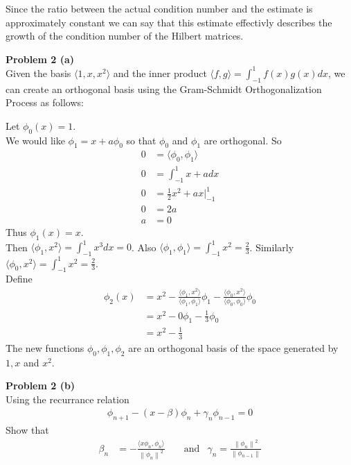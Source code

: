 \documentclass[12pt]{article}
\newcommand{\problem}[1]{\hspace{-4 ex} \large \textbf{Problem #1} }
\newcommand{\norm}[1]{\left\lVert#1\right\rVert}
\begin{document}
	Since the ratio between the actual condition number and the estimate is approximately constant we can say that this estimate effectivly describes the growth of the condition number of the Hilbert matrices. 
	
\problem{2 (a)} \\
	
	Given the basis $ \langle 1, x, x^2 \rangle$ and the inner product $\langle f, g \rangle = \int_{-1}^1 f(x)g(x)dx$, we can create an orthogonal basis using the Gram-Schmidt Orthogonalization Process as follows:\bigbreak
	
	Let $\phi_0(x) = 1$. \\
	We would like $\phi_1 = x + a \phi_0$ so that $\phi_0$ and $\phi_1$ are orthogonal. So
	\begin{align*}
		0 & = \langle \phi_0, \phi_1 \rangle \\
		0 & = \int_{-1}^1 x + a dx \\
		0 & = \tfrac{1}{2}x^2 + ax \big\vert_{-1}^1 \\
		0 & = 2a \\
		a & = 0
	\end{align*}
	Thus $\phi_1(x) = x$. \\
	Then $\langle \phi_1, x^2 \rangle = \int_{-1}^1 x^3 dx = 0$. Also $ \langle \phi_1, \phi_1 \rangle = \int_{-1}^1 x^2 =  \tfrac{2}{3}$. Similarly $ \langle \phi_0, x^2 \rangle = \int_{-1}^1 x^2 =  \tfrac{2}{3}$. \\
	Define 
	\begin{align*}
		\phi_2(x) & = x^2 - \frac{\langle \phi_1, x^2 \rangle}{\langle \phi_1, \phi_1 \rangle} \phi_1 - \frac{\langle \phi_0, x^2 \rangle}{\langle \phi_0, \phi_0 \rangle} \phi_0 \\
		& = x^2 - 0 \phi_1 - \tfrac{1}{3}\phi_0 \\
		& = x^2 - \tfrac{1}{3}
	\end{align*}
	The new functions $\phi_0, \phi_1, \phi_2$ are an orthogonal basis of the space generated by $1, x$ and $x^2$.

\problem{2 (b)} \\

	Using the recurrance relation
	\begin{align}
		\phi_{n+1} - (x - \beta) \phi_n + \gamma_n \phi_{n-1} = 0 \label{eq1}
	\end{align}
	Show that 
	\begin{align*}
		\beta_n & = - \frac{\langle x \phi_n, \phi_n \rangle}{\norm{\phi_n}^2} & &\text{\ and} & \gamma_n = \frac{\norm{\phi_n}^2}{ \norm{\phi_{n-1}}}
	\end{align*}
	
\end{document}
